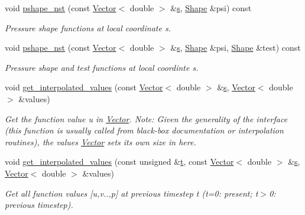 \begin{DoxyCompactItemize}
void \hyperlink{classoomph_1_1PRefineableGeneralisedNewtonianQCrouzeixRaviartElement_a08a69865335d8b43be653b21a4ca358f}{pshape\+\_\+nst} (const \hyperlink{classoomph_1_1Vector}{Vector}$<$ double $>$ \&\hyperlink{cfortran_8h_ab7123126e4885ef647dd9c6e3807a21c}{s}, \hyperlink{classoomph_1_1Shape}{Shape} \&psi) const
\begin{DoxyCompactList}\small\item\em Pressure shape functions at local coordinate s. \end{DoxyCompactList}\item 
void \hyperlink{classoomph_1_1PRefineableGeneralisedNewtonianQCrouzeixRaviartElement_a5abe327bf24e7d27f57d72522ea776b8}{pshape\+\_\+nst} (const \hyperlink{classoomph_1_1Vector}{Vector}$<$ double $>$ \&\hyperlink{cfortran_8h_ab7123126e4885ef647dd9c6e3807a21c}{s}, \hyperlink{classoomph_1_1Shape}{Shape} \&psi, \hyperlink{classoomph_1_1Shape}{Shape} \&test) const
\begin{DoxyCompactList}\small\item\em Pressure shape and test functions at local coordinte s. \end{DoxyCompactList}\item 
void \hyperlink{classoomph_1_1PRefineableGeneralisedNewtonianQCrouzeixRaviartElement_ae315f247e79d4520c6de82aa859d7237}{get\+\_\+interpolated\+\_\+values} (const \hyperlink{classoomph_1_1Vector}{Vector}$<$ double $>$ \&\hyperlink{cfortran_8h_ab7123126e4885ef647dd9c6e3807a21c}{s}, \hyperlink{classoomph_1_1Vector}{Vector}$<$ double $>$ \&values)
\begin{DoxyCompactList}\small\item\em Get the function value u in \hyperlink{classoomph_1_1Vector}{Vector}. Note\+: Given the generality of the interface (this function is usually called from black-\/box documentation or interpolation routines), the values \hyperlink{classoomph_1_1Vector}{Vector} sets its own size in here. \end{DoxyCompactList}\item 
void \hyperlink{classoomph_1_1PRefineableGeneralisedNewtonianQCrouzeixRaviartElement_ada4c5910a99fc57caff3c190307c7a87}{get\+\_\+interpolated\+\_\+values} (const unsigned \&\hyperlink{cfortran_8h_af6f0bd3dc13317f895c91323c25c2b8f}{t}, const \hyperlink{classoomph_1_1Vector}{Vector}$<$ double $>$ \&\hyperlink{cfortran_8h_ab7123126e4885ef647dd9c6e3807a21c}{s}, \hyperlink{classoomph_1_1Vector}{Vector}$<$ double $>$ \&values)
\begin{DoxyCompactList}\small\item\em Get all function values \mbox{[}u,v..,p\mbox{]} at previous timestep t (t=0\+: present; t$>$0\+: previous timestep). \end{DoxyCompactList}\item 

\end{DoxyCompactItemize}
